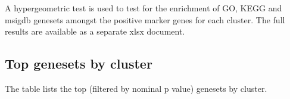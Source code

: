 A hypergeometric test is used to test for the enrichment of GO, KEGG and msigdb genesets amongst the positive marker genes for each cluster. The full results
are available as a separate xlsx document.



\clearpage

\subsection{Top genesets by cluster}

The table lists the top (filtered by nominal p value) genesets by cluster.



\clearpage
